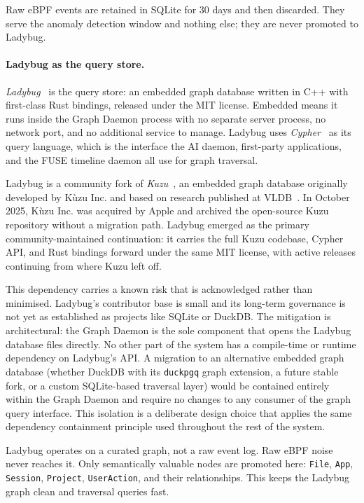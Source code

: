 Raw eBPF events are retained in SQLite for 30 days and then discarded. They
serve the anomaly detection window and nothing else; they are never promoted
to Ladybug.

\paragraph{Ladybug as the query store.}
\emph{Ladybug}~\cite{ladybug} is the query store: an embedded graph database written
in C++ with first-class Rust bindings, released under the MIT license.
Embedded means it runs inside the Graph Daemon process with no separate server
process, no network port, and no additional service to manage. Ladybug uses
\emph{Cypher}~\cite{opencypher} as its query language, which is the interface
the AI daemon, first-party applications, and the FUSE timeline daemon all use
for graph traversal.

Ladybug is a community fork of \emph{Kuzu}~\cite{kuzu}, an embedded graph
database originally developed by Kùzu Inc. and based on research published at
VLDB~\cite{kuzu:vldb}. In October 2025, Kùzu Inc. was acquired by Apple and
archived the open-source Kuzu repository without a migration path. Ladybug
emerged as the primary community-maintained continuation: it carries the full
Kuzu codebase, Cypher API, and Rust bindings forward under the same MIT
license, with active releases continuing from where Kuzu left off.

This dependency carries a known risk that is acknowledged rather than
minimised. Ladybug's contributor base is small and its long-term governance is
not yet as established as projects like SQLite or DuckDB. The mitigation is
architectural: the Graph Daemon is the sole component that opens the Ladybug
database files directly. No other part of the system has a compile-time or
runtime dependency on Ladybug's API. A migration to an alternative embedded
graph database (whether DuckDB with its \texttt{duckpgq} graph extension,
a future stable fork, or a custom SQLite-based traversal layer) would be
contained entirely within the Graph Daemon and require no changes to any
consumer of the graph query interface. This isolation is a deliberate design
choice that applies the same dependency containment principle used throughout
the rest of the system.

Ladybug operates on a curated graph, not a raw event log. Raw eBPF noise never
reaches it. Only semantically valuable nodes are promoted here: \texttt{File},
\texttt{App}, \texttt{Session}, \texttt{Project}, \texttt{UserAction}, and
their relationships. This keeps the Ladybug graph clean and traversal queries
fast.

